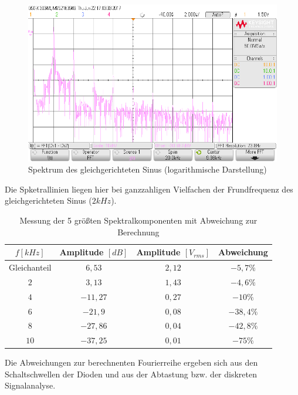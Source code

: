 \documentclass[12pt,a4paper,titlepage]{article}
\begin{document}
\begin{figure}[H]
  \centering
  \includegraphics[width=150mm]{scope_57.png}
  \caption{Spektrum des gleichgerichteten Sinus (logarithmische Darstellung)}
\end{figure}

\noindent Die Spketrallinien liegen hier bei ganzzahligen Vielfachen der Frundfrequenz des gleichgerichteten Sinus ($2kHz$).


\begin{table}[H]
  \centering
  \begin{tabular}{c|c|c|c}
    $f [kHz]$ & Amplitude $[dB]$ & Amplitude $[V_{rms}]$ & Abweichung \\
    \hline
    Gleichanteil & $6,53$ & $2,12$ & $-5,7\%$ \\
    \hline
    $2$ & $3,13$ & $1,43$ & $-4,6\%$ \\
    \hline
    $4$ & $-11,27$ & $0,27$ & $-10\%$ \\
    \hline
    $6$ & $-21,9$ & $0,08$ & $-38,4\%$ \\
    \hline
    $8$ & $-27,86$ & $0,04$ & $-42,8\%$ \\
    \hline
    $10$ & $-37,25$ & $0,01$ & $-75\%$ \\
  \end{tabular}
  \caption{Messung der 5 größten Spektralkomponenten mit Abweichung zur Berechnung}
\end{table}

\noindent Die Abweichungen zur berechnenten Fourierreihe ergeben sich aus den Schaltschwellen der Dioden und aus der Abtastung bzw. der diskreten Signalanalyse.
\end{document}
